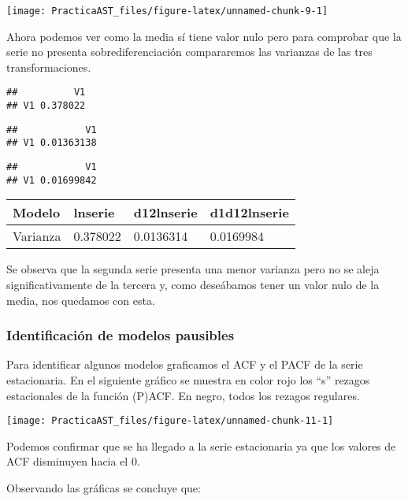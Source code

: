\documentclass[
]{article}
\begin{document}
\begin{center}\texttt{[image: PracticaAST\_files/figure-latex/unnamed-chunk-9-1]} \end{center}

Ahora podemos ver como la media sí tiene valor nulo pero para comprobar
que la serie no presenta sobrediferenciación compararemos las varianzas
de las tres transformaciones.

\begin{verbatim}
##          V1
## V1 0.378022
\end{verbatim}

\begin{verbatim}
##            V1
## V1 0.01363138
\end{verbatim}

\begin{verbatim}
##            V1
## V1 0.01699842
\end{verbatim}

\begin{longtable}[]{@{}llll@{}}
\toprule()
Modelo & lnserie & d12lnserie & d1d12lnserie \\
\midrule()
\endhead
Varianza & 0.378022 & 0.0136314 & 0.0169984 \\
\bottomrule()
\end{longtable}

Se observa que la segunda serie presenta una menor varianza pero no se
aleja significativamente de la tercera y, como deseábamos tener un valor
nulo de la media, nos quedamos con esta.

\hypertarget{identificaciuxf3n-de-modelos-pausibles}{%
\subsubsection{Identificación de modelos
pausibles}\label{identificaciuxf3n-de-modelos-pausibles}}

Para identificar algunos modelos graficamos el ACF y el PACF de la serie
estacionaria. En el siguiente gráfico se muestra en color rojo los ``s''
rezagos estacionales de la función (P)ACF. En negro, todos los rezagos
regulares.

\begin{center}\texttt{[image: PracticaAST\_files/figure-latex/unnamed-chunk-11-1]} \end{center}

Podemos confirmar que se ha llegado a la serie estacionaria ya que los
valores de ACF disminuyen hacia el 0.

Observando las gráficas se concluye que:
\end{document}
